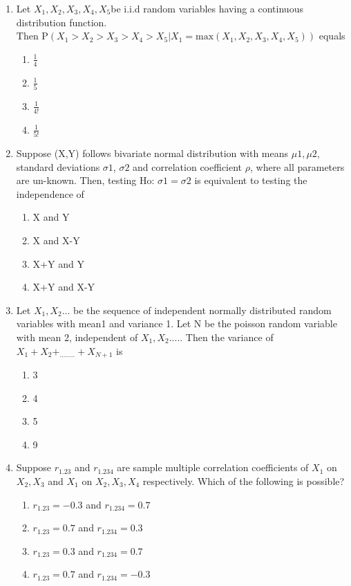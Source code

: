 \documentclass[journal,12pt,twocolumn]{IEEEtran}
\begin{document}
\begin{enumerate}[label=\arabic*.,ref=\theenumi]
\item Let $X_1, X_2, X_3, X_4, X_5 $be i.i.d random variables having a continuous distribution function. $\text {Then P}(X_1>X_2>X_3>X_4>X_5|X_1 = \text {max}(X_1,X_2,X_3,X_4,X_5))$ equals
\begin{enumerate}
\item $\displaystyle\frac{1}{4}$
\item $\displaystyle\frac{1}{5}$
\item $\displaystyle\frac{1}{4!}$
\item $\displaystyle\frac{1}{5!}$
\end{enumerate}
\item Suppose (X,Y) follows bivariate normal distribution with means $\mu1, \mu2$, standard deviations $\sigma1$, $\sigma2$ and correlation coefficient $\rho$, where all parameters are un-known. Then, testing Ho: $\sigma1=\sigma2$ is equivalent to testing the independence of  
\begin{enumerate}
\item X and Y 
\item X and X-Y  
\item X+Y and Y 
\item X+Y and X-Y 
\end{enumerate}
\item Let $X_1, X_2...$ be the sequence of independent normally distributed random variables with mean1 and variance 1. Let N be the poisson random variable with mean 2, independent of $X_1, X_2....$. Then the variance of $X_1 + X_2 + _{........}+X_{N+1}$ is
\begin{enumerate}
\item 3
\item 4
\item 5
\item 9
\end{enumerate}
\item Suppose \(r_{1.23}\) and \(r_{1.234}\) are sample multiple correlation coefficients of \(X_1\) on \(X_2,X_3\) and \(X_1\) on \(X_2,X_3,X_4\) respectively. Which of the following is possible?
\begin{enumerate}
\item \quad \(r_{1.23} = -0.3\) and \(r_{1.234} = 0.7\)
\item \quad \(r_{1.23} = 0.7\) and \(r_{1.234} = 0.3\)
\item \quad \(r_{1.23} = 0.3\) and \(r_{1.234} = 0.7\)
\item \quad \(r_{1.23} = 0.7\) and \(r_{1.234} = -0.3\)
\end{enumerate}

\end{enumerate}
\end{document}

